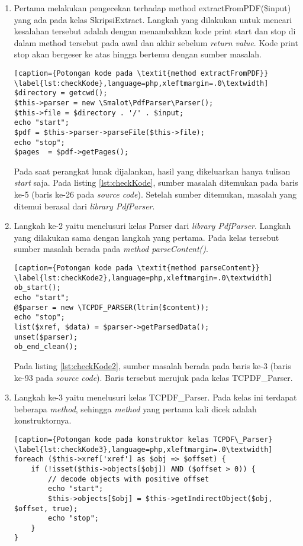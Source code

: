 \begin{enumerate}
	\item Pertama melakukan pengecekan terhadap method extractFromPDF(\$input) yang ada pada kelas SkripsiExtract. Langkah yang dilakukan untuk mencari kesalahan tersebut adalah dengan menambahkan kode print start dan stop di dalam method tersebut pada awal dan akhir sebelum \textit{return value}. Kode print stop akan bergeser ke atas hingga bertemu dengan sumber masalah. 
	
\begin{lstlisting}[caption={Potongan kode pada \textit{method extractFromPDF}}	\label{lst:checkKode},language=php,xleftmargin=.0\textwidth]
$directory = getcwd();
$this->parser = new \Smalot\PdfParser\Parser();
$this->file = $directory . '/' . $input;
echo "start";
$pdf = $this->parser->parseFile($this->file);
echo "stop";
$pages  = $pdf->getPages();
\end{lstlisting}

Pada saat perangkat lunak dijalankan, hasil yang dikeluarkan hanya tulisan \textit{start} saja. Pada listing \ref{lst:checkKode}, sumber masalah ditemukan pada baris ke-5 (baris ke-26 pada \textit{source code}). Setelah sumber ditemukan, masalah yang ditemui berasal dari \textit{library PdfParser}.
	
	\item Langkah ke-2 yaitu menelusuri kelas Parser dari \textit{library PdfParser}. Langkah yang dilakukan sama dengan langkah yang pertama. Pada kelas tersebut sumber masalah berada pada \textit{method parseContent()}.
	
\begin{lstlisting}[caption={Potongan kode pada \textit{method parseContent}}	\label{lst:checkKode2},language=php,xleftmargin=.0\textwidth]
ob_start();
echo "start";
@$parser = new \TCPDF_PARSER(ltrim($content));
echo "stop";
list($xref, $data) = $parser->getParsedData();
unset($parser);
ob_end_clean();
\end{lstlisting}
	
	Pada listing \ref{lst:checkKode2}, sumber masalah berada pada baris ke-3 (baris ke-93 pada \textit{source code}). Baris tersebut merujuk pada kelas TCPDF\_Parser.	
	
	\item Langkah ke-3 yaitu menelusuri kelas TCPDF\_Parser. Pada kelas ini terdapat beberapa \textit{method}, sehingga \textit{method} yang pertama kali dicek adalah konstruktornya.
	
\begin{lstlisting}[caption={Potongan kode pada konstruktor kelas TCPDF\_Parser}	\label{lst:checkKode3},language=php,xleftmargin=.0\textwidth]
foreach ($this->xref['xref'] as $obj => $offset) {
	if (!isset($this->objects[$obj]) AND ($offset > 0)) {
		// decode objects with positive offset
		echo "start";
		$this->objects[$obj] = $this->getIndirectObject($obj, $offset, true);
		echo "stop";
	}
}
\end{lstlisting}


\end{enumerate}
